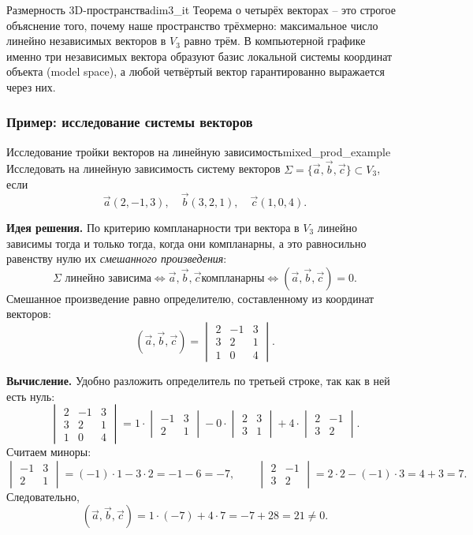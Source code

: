 \documentclass[12pt,a4paper]{article}
\begin{document}
\begin{remarkIT}{Размерность 3D-пространства}{dim3_it}
Теорема о четырёх векторах -- это строгое объяснение того, почему наше
пространство трёхмерно: максимальное число линейно независимых векторов
в $V_3$ равно трём. В компьютерной графике именно три независимых
вектора образуют базис локальной системы координат объекта (model
space), а любой четвёртый вектор гарантированно выражается через них.
\end{remarkIT}

\subsubsection*{Пример: исследование системы векторов}

\begin{definition}{Исследование тройки векторов на линейную
зависимость}{mixed_prod_example}
Исследовать на линейную зависимость систему векторов $\Sigma =
\{\vec{a}, \vec{b}, \vec{c}\} \subset V_3$, если
\[
\vec{a}(2, -1, 3), \quad \vec{b}(3, 2, 1), \quad \vec{c}(1, 0, 4).
\]

\textbf{Идея решения.} По критерию компланарности три вектора в $V_3$
линейно зависимы тогда и только тогда, когда они компланарны, а это
равносильно равенству нулю их \emph{смешанного произведения}:
\[
\Sigma \text{ линейно зависима} \iff \vec{a}, \vec{b}, \vec{c} \text{
компланарны} \iff (\vec{a}, \vec{b}, \vec{c}) = 0.
\]
Смешанное произведение равно определителю, составленному из координат
векторов:
\[
(\vec{a}, \vec{b}, \vec{c}) =
\begin{vmatrix}
  2 & -1 & 3 \\
  3 & 2 & 1 \\
  1 & 0 & 4
\end{vmatrix}.
\]

\textbf{Вычисление.} Удобно разложить определитель по третьей строке,
так как в ней есть нуль:
\[
\begin{vmatrix}
  2 & -1 & 3 \\
  3 & 2 & 1 \\
  1 & 0 & 4
\end{vmatrix}
= 1 \cdot
\begin{vmatrix} -1 & 3 \\ 2 & 1
\end{vmatrix}
- 0 \cdot
\begin{vmatrix} 2 & 3 \\ 3 & 1
\end{vmatrix}
+ 4 \cdot
\begin{vmatrix} 2 & -1 \\ 3 & 2
\end{vmatrix}.
\]
Считаем миноры:
\[
\begin{vmatrix} -1 & 3 \\ 2 & 1
\end{vmatrix} = (-1)\cdot 1 - 3\cdot 2
= -1 - 6 = -7,
\qquad
\begin{vmatrix} 2 & -1 \\ 3 & 2
\end{vmatrix} = 2\cdot 2 - (-1)\cdot 3
= 4 + 3 = 7.
\]
Следовательно,
\[
(\vec{a}, \vec{b}, \vec{c}) = 1\cdot(-7) + 4\cdot 7 = -7 + 28 = 21
\neq 0.
\]


\end{definition}
\end{document}
